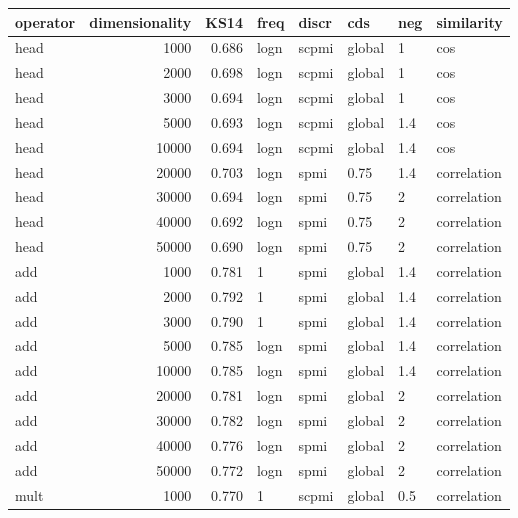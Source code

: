\begin{tabular}{lrrlllll}
\toprule
operator &  dimensionality &   KS14 &  freq &  discr &     cds &  neg &     similarity \\
\midrule
    head &            1000 &  0.686 &  logn &  scpmi &  global &    1 &            cos \\
    head &            2000 &  0.698 &  logn &  scpmi &  global &    1 &            cos \\
    head &            3000 &  0.694 &  logn &  scpmi &  global &    1 &            cos \\
    head &            5000 &  0.693 &  logn &  scpmi &  global &  1.4 &            cos \\
    head &           10000 &  0.694 &  logn &  scpmi &  global &  1.4 &            cos \\
    head &           20000 &  0.703 &  logn &   spmi &    0.75 &  1.4 &    correlation \\
    head &           30000 &  0.694 &  logn &   spmi &    0.75 &    2 &    correlation \\
    head &           40000 &  0.692 &  logn &   spmi &    0.75 &    2 &    correlation \\
    head &           50000 &  0.690 &  logn &   spmi &    0.75 &    2 &    correlation \\
     add &            1000 &  0.781 &     1 &   spmi &  global &  1.4 &    correlation \\
     add &            2000 &  0.792 &     1 &   spmi &  global &  1.4 &    correlation \\
     add &            3000 &  0.790 &     1 &   spmi &  global &  1.4 &    correlation \\
     add &            5000 &  0.785 &  logn &   spmi &  global &  1.4 &    correlation \\
     add &           10000 &  0.785 &  logn &   spmi &  global &  1.4 &    correlation \\
     add &           20000 &  0.781 &  logn &   spmi &  global &    2 &    correlation \\
     add &           30000 &  0.782 &  logn &   spmi &  global &    2 &    correlation \\
     add &           40000 &  0.776 &  logn &   spmi &  global &    2 &    correlation \\
     add &           50000 &  0.772 &  logn &   spmi &  global &    2 &    correlation \\
    mult &            1000 &  0.770 &     1 &  scpmi &  global &  0.5 &    correlation \\

\end{tabular}
